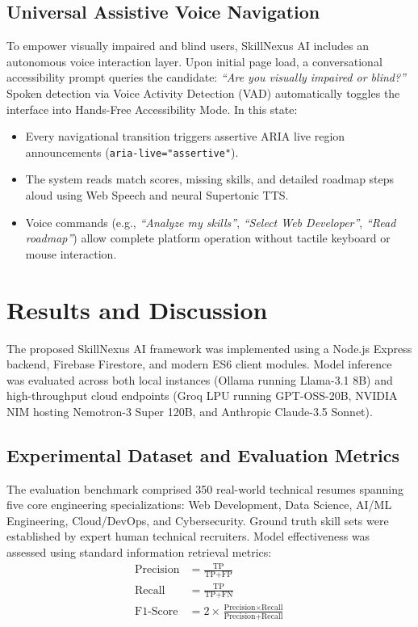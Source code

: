 \documentclass[conference]{IEEEtran}
\begin{document}
\subsection{Universal Assistive Voice Navigation}
To empower visually impaired and blind users, SkillNexus AI includes an autonomous voice interaction layer. Upon initial page load, a conversational accessibility prompt queries the candidate: \textit{``Are you visually impaired or blind?''} Spoken detection via Voice Activity Detection (VAD) automatically toggles the interface into Hands-Free Accessibility Mode. In this state:
\begin{itemize}
    \item Every navigational transition triggers assertive ARIA live region announcements (\texttt{aria-live="assertive"}).
    \item The system reads match scores, missing skills, and detailed roadmap steps aloud using Web Speech and neural Supertonic TTS.
    \item Voice commands (e.g., \textit{``Analyze my skills''}, \textit{``Select Web Developer''}, \textit{``Read roadmap''}) allow complete platform operation without tactile keyboard or mouse interaction.
\end{itemize}

\section{Results and Discussion}
The proposed SkillNexus AI framework was implemented using a Node.js Express backend, Firebase Firestore, and modern ES6 client modules. Model inference was evaluated across both local instances (Ollama running Llama-3.1 8B) and high-throughput cloud endpoints (Groq LPU running GPT-OSS-20B, NVIDIA NIM hosting Nemotron-3 Super 120B, and Anthropic Claude-3.5 Sonnet).

\subsection{Experimental Dataset and Evaluation Metrics}
The evaluation benchmark comprised 350 real-world technical resumes spanning five core engineering specializations: Web Development, Data Science, AI/ML Engineering, Cloud/DevOps, and Cybersecurity. Ground truth skill sets were established by expert human technical recruiters. Model effectiveness was assessed using standard information retrieval metrics:
\begin{align}
\text{Precision} &= \frac{\text{TP}}{\text{TP} + \text{FP}} \\
\text{Recall} &= \frac{\text{TP}}{\text{TP} + \text{FN}} \\
\text{F1-Score} &= 2 \times \frac{\text{Precision} \times \text{Recall}}{\text{Precision} + \text{Recall}}
\end{align}
\end{document}
